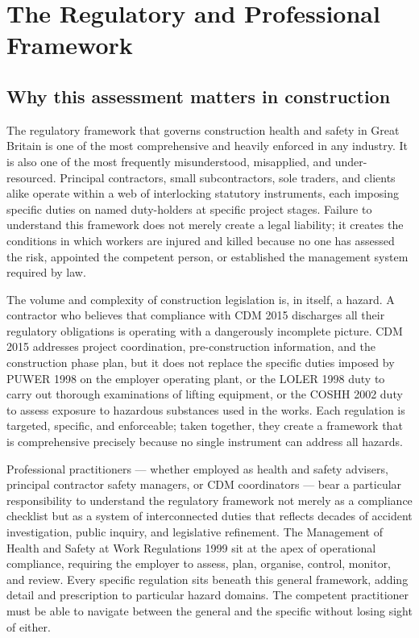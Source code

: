 \chapter{The Regulatory and Professional Framework}
\label{chap:The Regulatory and Professional Framework}

\section{Why this assessment matters in construction}

The regulatory framework that governs construction health and safety in Great Britain is one of the most comprehensive and heavily enforced in any industry. It is also one of the most frequently misunderstood, misapplied, and under-resourced. Principal contractors, small subcontractors, sole traders, and clients alike operate within a web of interlocking statutory instruments, each imposing specific duties on named duty-holders at specific project stages. Failure to understand this framework does not merely create a legal liability; it creates the conditions in which workers are injured and killed because no one has assessed the risk, appointed the competent person, or established the management system required by law.

The volume and complexity of construction legislation is, in itself, a hazard. A contractor who believes that compliance with CDM 2015 discharges all their regulatory obligations is operating with a dangerously incomplete picture. CDM 2015 addresses project coordination, pre-construction information, and the construction phase plan, but it does not replace the specific duties imposed by PUWER 1998 on the employer operating plant, or the LOLER 1998 duty to carry out thorough examinations of lifting equipment, or the COSHH 2002 duty to assess exposure to hazardous substances used in the works. Each regulation is targeted, specific, and enforceable; taken together, they create a framework that is comprehensive precisely because no single instrument can address all hazards.

Professional practitioners --- whether employed as health and safety advisers, principal contractor safety managers, or CDM coordinators --- bear a particular responsibility to understand the regulatory framework not merely as a compliance checklist but as a system of interconnected duties that reflects decades of accident investigation, public inquiry, and legislative refinement. The Management of Health and Safety at Work Regulations 1999 sit at the apex of operational compliance, requiring the employer to assess, plan, organise, control, monitor, and review. Every specific regulation sits beneath this general framework, adding detail and prescription to particular hazard domains. The competent practitioner must be able to navigate between the general and the specific without losing sight of either.

